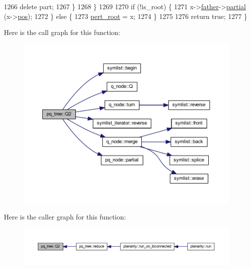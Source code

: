 \begin{DoxyCode}
1266         \textcolor{keyword}{delete} part;
1267     \}
1268     \} 
1269     
1270     \textcolor{keywordflow}{if} (!is\_root) \{
1271     x->\mbox{\hyperlink{classpq__node_a3e7c886498c76c633f057fb42ff9c435}{father}}->\mbox{\hyperlink{classpq__node_aa6830ab47a280f41fe61b7d2f8b508bb}{partial}} (x->\mbox{\hyperlink{classpq__node_a5e8a5defa0fec4ff2e82fabee97296b4}{pos}});
1272     \} \textcolor{keywordflow}{else} \{
1273     \mbox{\hyperlink{classpq__tree_adf0d16ca5a29bfbe863efb525135ac01}{pert\_root}} = x;
1274     \}
1275     
1276     \textcolor{keywordflow}{return} \textcolor{keyword}{true};
1277 \}
\end{DoxyCode}
Here is the call graph for this function\+:\nopagebreak
\begin{figure}[H]
\begin{center}
\leavevmode
\includegraphics[width=350pt]{classpq__tree_a76ca10878264d589c1a11f4f4bf93f83_cgraph}
\end{center}
\end{figure}
Here is the caller graph for this function\+:\nopagebreak
\begin{figure}[H]
\begin{center}
\leavevmode
\includegraphics[width=350pt]{classpq__tree_a76ca10878264d589c1a11f4f4bf93f83_icgraph}
\end{center}
\end{figure}
\mbox{\label{classpq__tree_aaf2d4b1daf78f11cb3377d40a8125ac1}} 
